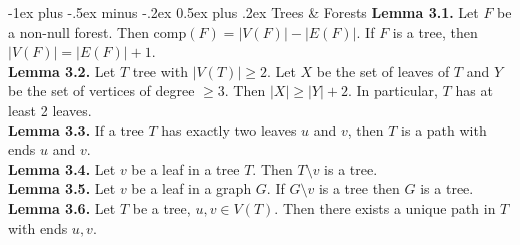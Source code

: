 \documentclass[10pt,landscape]{article}
\makeatletter
\renewcommand{\section}{\@startsection{section}{1}{0mm}%
                                {-1ex plus -.5ex minus -.2ex}%
                                {0.5ex plus .2ex}%
                                {\normalfont\large\bfseries}}
\makeatother
\begin{document}
\begin{multicols}{3}
\section{Trees \& Forests}
\textbf{Lemma 3.1.} Let \( F \) be a non-null forest. Then \( \mbox{comp}(F) = |V(F)| - |E(F)| \). If \( F \) is a tree, then \( |V(F)| = |E(F)| + 1 \). \\
\textbf{Lemma 3.2.} Let \( T \) tree with \( |V(T)| \geq 2 \). Let \( X \) be the set of leaves of \( T \) and \( Y \) be the set of vertices of degree \( \geq 3 \). Then \( |X| \geq |Y| + 2 \). In particular, \( T \) has at least 2 leaves. \\
\textbf{Lemma 3.3.} If a tree \( T \) has exactly two leaves \( u \) and \( v \), then \( T \) is a path with ends \( u \) and \( v \). \\
\textbf{Lemma 3.4.} Let \( v \) be a leaf in a tree \( T \). Then \( T \setminus v \) is a tree. \\
\textbf{Lemma 3.5.} Let \( v \) be a leaf in a graph \( G \). If \( G \setminus v \) is a tree then \( G \) is a tree. \\
\textbf{Lemma 3.6.} Let \( T \) be a tree, \( u,v \in V(T) \). Then there exists a unique path in \( T \) with ends \( u,v\).

\end{multicols}
\end{document}
